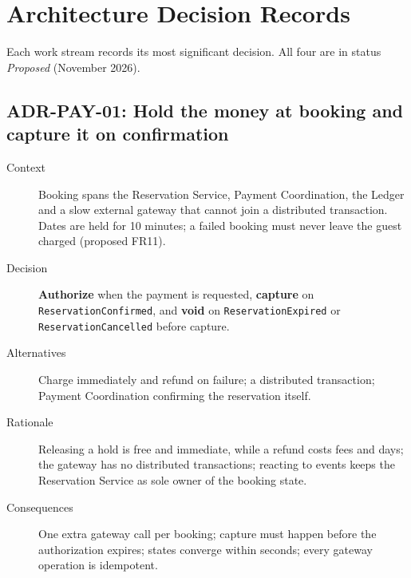 \section{Architecture Decision Records}

Each work stream records its most significant decision. All four are in
status \emph{Proposed} (November 2026).

\subsection{ADR-PAY-01: Hold the money at booking and capture it on confirmation}
\begin{description}
  \item[Context] Booking spans the Reservation Service, Payment Coordination,
    the Ledger and a slow external gateway that cannot join a distributed
    transaction. Dates are held for 10 minutes; a failed booking must never
    leave the guest charged (proposed FR11).
  \item[Decision] \textbf{Authorize} when the payment is requested,
    \textbf{capture} on \texttt{Reservation\allowbreak Confirmed}, and \textbf{void} on
    \texttt{Reservation\allowbreak Expired} or \texttt{Reservation\allowbreak Cancelled} before
    capture.
  \item[Alternatives] Charge immediately and refund on failure; a distributed
    transaction; Payment Coordination confirming the reservation itself.
  \item[Rationale] Releasing a hold is free and immediate, while a refund
    costs fees and days; the gateway has no distributed transactions; reacting
    to events keeps the Reservation Service as sole owner of the booking state.
  \item[Consequences] One extra gateway call per booking; capture must happen
    before the authorization expires; states converge within seconds; every
    gateway operation is idempotent.
\end{description}

